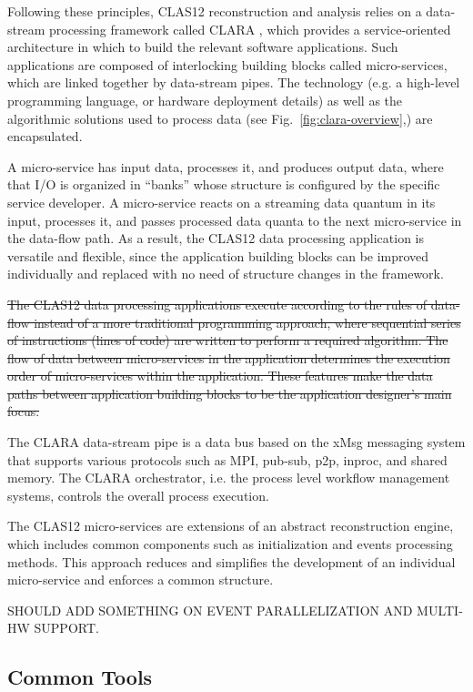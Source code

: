Following these principles, CLAS12 reconstruction and analysis relies on a data-stream processing framework called CLARA \cite{clara-2011,clara-service,framework,clara-2016}, which provides a service-oriented architecture in which to build the relevant software applications.  Such applications are composed of interlocking building blocks called micro-services, which are linked together by data-stream pipes.  The technology (e.g. a high-level programming language, or hardware deployment details) as well as the algorithmic solutions used to process data (see Fig.~\ref{fig:clara-overview},) are encapsulated.

A micro-service has input data, processes it, and produces output data, where that I/O is organized in ``banks'' whose structure is configured by the specific service developer.  A micro-service reacts on a streaming data quantum in its input, processes it, and passes processed data quanta to the next micro-service in the data-flow path.  As a result, the CLAS12 data processing application is versatile and flexible, since the application building blocks can be improved individually and replaced with no need of structure changes in the framework.

\sout{The CLAS12 data processing applications execute according to the rules of data-flow instead of a more traditional programming approach, where sequential series of instructions (lines of code) are written to perform a required algorithm. The flow of data between micro-services in the application determines the execution order of micro-services within the application. These features make the data paths between application building blocks to be the application designer’s main focus.}

The CLARA data-stream pipe is a data bus based on the xMsg messaging system that supports various protocols such as MPI, pub-sub, p2p, inproc, and shared memory. The CLARA orchestrator, i.e. the process level workflow management systems, controls the overall process execution. 

The CLAS12 micro-services are extensions of an abstract reconstruction engine, which includes common components such as initialization and events processing methods. This approach reduces and simplifies the development of an individual micro-service and enforces a common structure. 

SHOULD ADD SOMETHING ON EVENT PARALLELIZATION AND MULTI-HW SUPPORT.

\subsection{Common Tools}
\label{common-tools}


